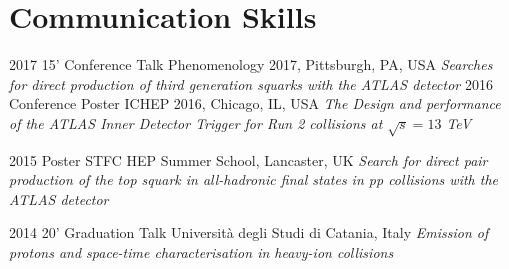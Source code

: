 \documentclass[print]{cv} %
\begin{document}
\section{Communication Skills}

\begin{entrylist}
  \entry
    {2017}
    {15' Conference Talk}
    {Phenomenology 2017, Pittsburgh, PA, USA}
    {\emph{Searches for direct production of third generation squarks with the ATLAS detector}}
  \entry
    {2016}
    {Conference Poster}
    {ICHEP 2016, Chicago, IL, USA}
    {\emph{The Design and performance of the ATLAS Inner Detector Trigger for Run 2 collisions at $\sqrt{s} = 13$ TeV}}

  \entry
    {2015}
    {Poster}
    {STFC HEP Summer School, Lancaster, UK}
    {\emph{Search for direct pair production of the top squark in all-hadronic final states in \emph{pp} collisions with the ATLAS detector}}

  \entry
    {2014}
    {20' Graduation Talk}
    {Università degli Studi di Catania, Italy}
    {\emph{Emission of protons and space-time characterisation in heavy-ion collisions}}
\end{entrylist}


\end{document}
